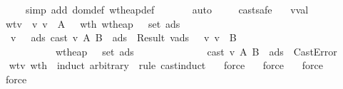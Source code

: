 \begin{isabellebody}
\ \ \ \ \ \ \isamarkupfalse \ {\isacharparenleft}simp\ add{\isacharcolon}\ dom{\isacharunderscore}def\ wt{\isacharunderscore}heap{\isacharunderscore}def{\isacharparenright}\isanewline
\ \ \ \ \ \ \isamarkupfalse \ auto\ \isamarkupfalse \isanewline
\ \ \isamarkupfalse \isanewline
{}\isamarkupfalse \endisatagproof
{\isafoldproof}\isadelimproof
\isanewline
\endisadelimproof
\isanewline
{}\isamarkupfalse \ cast{\isacharunderscore}safe{\isacharcolon}\isanewline
\ \ \ v{\isacharcolon}{\isacharcolon}val\isanewline
\ \ \ wtv{\isacharcolon}\ {\isachardoublequoteopen}{\isasymSigma}\ {\isasymturnstile}v\ v\ {\isacharcolon}\ A{\isachardoublequoteclose}\ \ \ wth{\isacharcolon}\ {\isachardoublequoteopen}wt{\isacharunderscore}heap\ {\isasymSigma}\ {\isasymmu}\ {\isacharparenleft}set\ ads{}{\isacharparenright}{\isachardoublequoteclose}\isanewline
\ \ \ {\isachardoublequoteopen}{\isacharparenleft}{\isasymexists}\ v{\isacharprime}\ {\isasymSigma}{\isacharprime}\ {\isasymmu}{\isacharprime}\ ads{}{\isachardot}\ cast\ v\ A\ B\ {\isasymmu}\ ads{}\ {\isacharequal}\ Result\ {\isacharparenleft}v{\isacharprime}{\isacharcomma}{\isasymmu}{\isacharprime}{\isacharcomma}ads{}{\isacharparenright}\ {\isasymand}\ {\isasymSigma}{\isacharprime}\ {\isasymturnstile}v\ v{\isacharprime}\ {\isacharcolon}\ B\isanewline
\ \ \ \ \ \ \ \ \ \ \ \ {\isasymand}\ wt{\isacharunderscore}heap\ {\isasymSigma}{\isacharprime}\ {\isasymmu}{\isacharprime}\ {\isacharparenleft}set\ ads{}{\isacharparenright}\ {\isasymand}\ {\isasymSigma}{\isacharprime}\ {\isasymsqsubseteq}\ {\isasymSigma}{\isacharparenright}\isanewline
\ \ \ \ \ \ \ \ \ {\isasymor}\ {\isacharparenleft}cast\ v\ A\ B\ {\isasymmu}\ ads{}\ {\isacharequal}\ CastError{\isacharparenright}{\isachardoublequoteclose}\ \isanewline
\isadelimproof
\ \ \endisadelimproof
\isatagproof
{}\isamarkupfalse \ wtv\ wth\ \isamarkupfalse \ {\isacharparenleft}induct\ arbitrary{\isacharcolon}\ {\isasymSigma}\ rule{\isacharcolon}\ cast{\isachardot}induct{\isacharparenright}\isanewline
\ \ \isamarkupfalse \ force\isanewline
\ \ \isamarkupfalse \ force\isanewline
\ \ \isamarkupfalse \ force\isanewline
\ \ \isamarkupfalse \ force\isanewline
\ \ \isamarkupfalse \isanewline
\ \ \isamarkupfalse \isanewline

\end{isabellebody}
